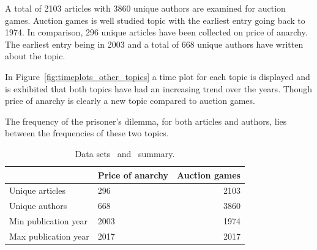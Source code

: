 \documentclass{article}
\theoremstyle{definition}
\begin{document}
A total of 2103 articles with 3860 unique authors are examined for auction games.
Auction games is well studied topic with the earliest entry going
back to 1974. In comparison, 296 unique articles have been collected on price of
anarchy. The earliest entry being in 2003 and a total of 668 unique authors have
written about the topic.

In Figure~\ref{fig:timeplots_other_topics} a time plot for each topic is
displayed and is exhibited that both topics have had an increasing trend over
the years. Though price of anarchy is clearly a new topic compared to auction games.

The frequency of the prisoner's dilemma, for both articles and authors, lies
between the frequencies of these two topics.

\begin{table}[!hbtp]
    \begin{center}
    \begin{tabular}{llr}
        \toprule
         &            Price of anarchy &  Auction games \\
        \midrule
        Unique articles      & 296  & 2103 \\
        Unique authors       & 668  & 3860 \\
        Min publication year & 2003 & 1974 \\
        Max publication year & 2017 & 2017 \\
        \bottomrule
    \end{tabular}
    \end{center}
    \caption{Data sets~\cite{} and~\cite{} summary.}
    \label{table:summary_other_topics}
\end{table}
\end{document}
